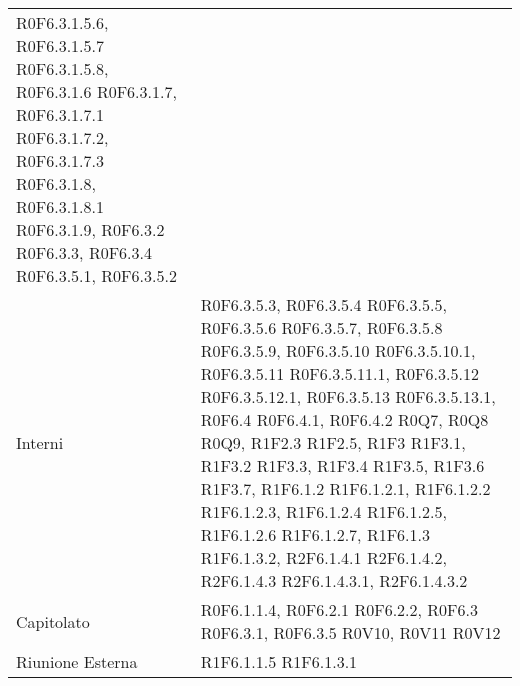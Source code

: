 \begin{longtable}{p{2.5cm}!{\VRule[1pt]}p{5.5cm}}
R0F6.3.1.5.6, R0F6.3.1.5.7 \newline
R0F6.3.1.5.8, R0F6.3.1.6 \newline
R0F6.3.1.7, R0F6.3.1.7.1 \newline
R0F6.3.1.7.2, R0F6.3.1.7.3 \newline
R0F6.3.1.8, R0F6.3.1.8.1 \newline
R0F6.3.1.9, R0F6.3.2 \newline
R0F6.3.3, R0F6.3.4 \newline
R0F6.3.5.1, R0F6.3.5.2 \\
Interni & R0F6.3.5.3, R0F6.3.5.4 \newline
R0F6.3.5.5, R0F6.3.5.6 \newline
R0F6.3.5.7, R0F6.3.5.8 \newline
R0F6.3.5.9, R0F6.3.5.10 \newline
R0F6.3.5.10.1, R0F6.3.5.11 \newline
R0F6.3.5.11.1, R0F6.3.5.12 \newline
R0F6.3.5.12.1, R0F6.3.5.13 \newline
R0F6.3.5.13.1, R0F6.4 \newline
R0F6.4.1, R0F6.4.2 \newline
R0Q7, R0Q8 \newline
R0Q9, R1F2.3 \newline
R1F2.5, R1F3 \newline
R1F3.1, R1F3.2 \newline
R1F3.3, R1F3.4 \newline
R1F3.5, R1F3.6 \newline
R1F3.7, R1F6.1.2 \newline
R1F6.1.2.1, R1F6.1.2.2 \newline
R1F6.1.2.3, R1F6.1.2.4 \newline
R1F6.1.2.5, R1F6.1.2.6 \newline
R1F6.1.2.7, R1F6.1.3 \newline
R1F6.1.3.2, R2F6.1.4.1 \newline
R2F6.1.4.2, R2F6.1.4.3 \newline
R2F6.1.4.3.1, R2F6.1.4.3.2 \\
Capitolato & R0F6.1.1.4, R0F6.2.1 \newline
R0F6.2.2, R0F6.3 \newline
R0F6.3.1, R0F6.3.5 \newline
R0V10, R0V11 \newline
R0V12\\
Riunione Esterna & R1F6.1.1.5 \newline
R1F6.1.3.1 \newline

\end{longtable}
